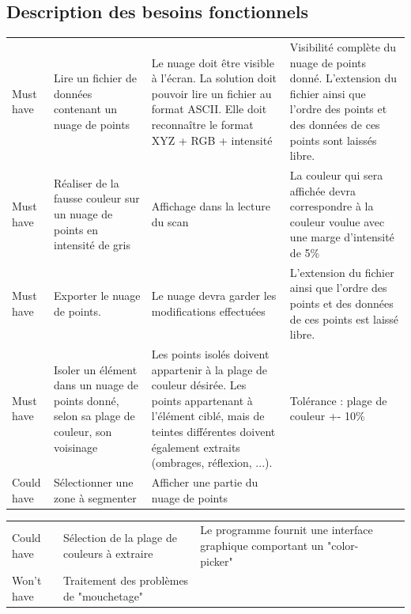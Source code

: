 \documentclass[12pt,titlepage,french]{article}
\begin{document}
\subsection*{Description des besoins fonctionnels}

\noindent\begin{tabu} to \toprule
     &&&\\\toprule
Must have
& Lire un fichier de données contenant un nuage de points
& Le nuage doit être visible à l'écran. La solution doit pouvoir lire un fichier au format ASCII. Elle doit reconnaître le format XYZ + RGB + intensité
& Visibilité complète du nuage de points donné. L'extension du fichier ainsi que l'ordre des points et des données de ces points sont laissés libre.\\\midrule
Must have 
& Réaliser de la fausse couleur sur un nuage de points en intensité de gris
& Affichage dans la lecture du scan
& La couleur qui sera affichée devra correspondre à la couleur voulue avec une marge d'intensité de 5\%\\\midrule
Must have 
& Exporter le nuage de points.
& Le nuage devra garder les modifications effectuées
& L'extension du fichier ainsi que l'ordre des points et des données de ces points est laissé libre.\\\midrule
Must have 
& Isoler un élément dans un nuage de points donné, selon sa plage de couleur, son voisinage
& Les points isolés doivent appartenir à la plage de couleur désirée.
Les points appartenant à l'élément ciblé, mais de teintes différentes doivent également extraits (ombrages, réflexion, ...).
& Tolérance : plage de couleur +- 10\% \\\midrule
Could have 
& Sélectionner une zone à segmenter
& Afficher une partie du nuage de points
& \\\bottomrule


\end{tabu}

\noindent\begin{tabu} to \toprule
     &&&\\\toprule
Could have
& Sélection de la plage de couleurs à extraire 
& Le programme fournit une interface graphique comportant un "color-picker"
& \\\midrule
Won't have
& Traitement des problèmes de "mouchetage"
& 
&\\\bottomrule
\end{tabu}
\end{document}
